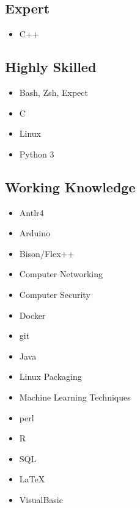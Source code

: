 \documentclass[10pt,a4paper,sans]{moderncv}        %
\begin{document}
\subsection{Expert}

\begin{multicols}{3}
\begin{itemize}

\item C++

\end{itemize}
\end{multicols}

\subsection{Highly Skilled}

\begin{multicols}{3}
\begin{itemize}

\item Bash, Zsh, Expect
\item C
\item Linux
\item Python 3

\end{itemize}
\end{multicols}

\subsection{Working Knowledge}

\begin{multicols}{3}
\begin{itemize}

\item Antlr4 
\item Arduino
\item Bison/Flex++
\item Computer Networking
\item Computer Security
\item Docker
\item git
\item Java
\item Linux Packaging
\item Machine Learning Techniques
\item perl
\item R
\item SQL
\item { \selectfont  \LaTeX }
\item VisualBasic

\end{itemize}
\end{multicols}
\end{document}

